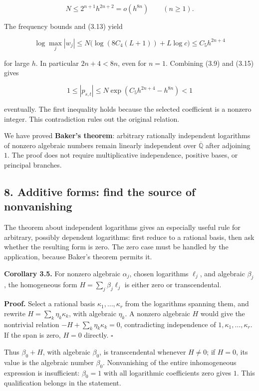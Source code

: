 \documentclass[
  11pt,
  a4paper,
]{article}
\begin{document}
\[
N\le2^{n+1}h^{2n+2}=o(h^{8n})\qquad(n\ge1).
\]

The frequency bounds and (3.13) yield

\[
\log\max_j|w_j|
\le N\bigl(\log(8C_4(L+1))+L\log c\bigr)\le C_5h^{2n+4}
\]

for large \(h\). In particular \(2n+4<8n\), even for \(n=1\). Combining
(3.9) and (3.15) gives

\[
1\le|p_{s,t}|\le N\exp(C_5h^{2n+4}-h^{8n})<1
\]

eventually. The first inequality holds because the selected coefficient
is a nonzero integer. This contradiction rules out the original
relation.

We have proved \textbf{Baker's theorem}: arbitrary rationally
independent logarithms of nonzero algebraic numbers remain linearly
independent over \(\overline{\mathbb Q}\) after adjoining \(1\). The
proof does not require multiplicative independence, positive bases, or
principal branches.

\subsection{8. Additive forms: find the source of
nonvanishing}\label{additive-forms-find-the-source-of-nonvanishing}

The theorem about independent logarithms gives an especially useful rule
for arbitrary, possibly dependent logarithms: first reduce to a rational
basis, then ask whether the resulting form is zero. The zero case must
be handled by the application, because Baker's theorem permits it.

\textbf{Corollary 3.5.} For nonzero algebraic \(\alpha_j\), chosen
logarithms \(\ell_j\), and algebraic \(\beta_j\), the homogeneous form
\(H=\sum_j\beta_j\ell_j\) is either zero or transcendental.

\textbf{Proof.} Select a rational basis \(\kappa_1,\ldots,\kappa_r\)
from the logarithms spanning them, and rewrite
\(H=\sum_k\eta_k\kappa_k\), with algebraic \(\eta_k\). A nonzero
algebraic \(H\) would give the nontrivial relation
\(-H+\sum_k\eta_k\kappa_k=0\), contradicting independence of
\(1,\kappa_1,\ldots,\kappa_r\). If the span is zero, \(H=0\) directly.
\(\square\)

Thus \(\beta_0+H\), with algebraic \(\beta_0\), is transcendental
whenever \(H\ne0\); if \(H=0\), its value is the algebraic number
\(\beta_0\). Nonvanishing of the entire inhomogeneous expression is
insufficient: \(\beta_0=1\) with all logarithmic coefficients zero gives
\(1\). This qualification belongs in the statement.
\end{document}
